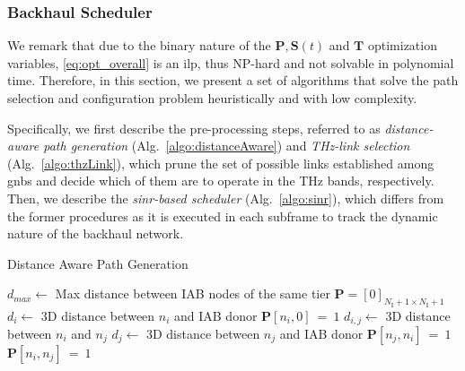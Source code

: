 \subsubsection{Backhaul Scheduler}
\label{sub:BackSche}

We remark that due to the binary nature of the $\bm{P}, \bm{S}(t)$ and $\bm{T}$ optimization variables, \eqref{eq:opt_overall} is an \gls{ilp}, thus NP-hard and not solvable in polynomial time. Therefore, in this section, we present a set of algorithms that solve the path selection and configuration problem heuristically and with low complexity. 

Specifically, we first describe the pre-processing steps, referred to as \textit{distance-aware path generation} (Alg.~\ref{algo:distanceAware}) and \textit{THz-link selection} (Alg.~\ref{algo:thzLink}), which prune the set of possible links established among \glspl{gnb} and decide which of them are to operate in the THz bands, respectively. Then, we describe the \textit{\gls{sinr}-based scheduler} (Alg.~\ref{algo:sinr}), which differs from the former procedures as it is executed in each subframe to track the dynamic nature of the backhaul network.

\begin{algorithm}[t]
\small
	\caption{Distance Aware Path Generation} 
	\begin{algorithmic}
    \State $d_{max} \gets$ Max distance between IAB nodes of the same tier
	\State $\bm{P} = [0]_{N_{\mathrm{I}} + 1 \times N_{\mathrm{I}} + 1}$
                \State $d_i \gets $ 3D distance between $n_i$ and IAB donor
                		\State $ \bm{P} [n_i, 0]~=~1$
                \EndIf
				\State $d_{i, j} \gets$ 3D distance between $n_i$ and $n_j$ 
    				\State $d_j \gets$ 3D distance between $n_j$ and IAB donor
        				\State $ \bm{P} [n_j, n_i]~=~1$
    				\Else 
    				    \State $ \bm{P} [n_i, n_j]~=~1$
				    \EndIf
				\EndIf
			\EndFor
		\EndFor
	\end{algorithmic} 
\label{algo:distanceAware}
\end{algorithm}

